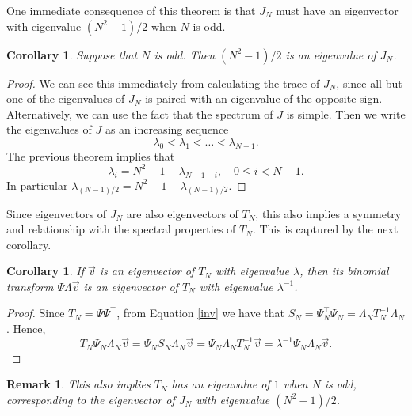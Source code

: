 \documentclass[11pt]{amsart}
\theoremstyle{plain}
\newtheorem{corollary}[theorem]{Corollary}
\newtheorem{remark}[theorem]{Remark}
\theoremstyle{named}
\begin{document}
One immediate consequence of this theorem is  that $J_N$ must have an eigenvector with eigenvalue $(N^2-1)/2$ when $N$ is odd.
\begin{corollary}
Suppose that $N$ is odd.
Then $(N^2-1)/2$ is an eigenvalue of $J_N$.
\end{corollary}
\begin{proof}
We can see this immediately from calculating the trace of $J_N$, since all but one of the eigenvalues of $J_N$ is paired with an eigenvalue of the opposite sign.
Alternatively, we can use the fact that the spectrum of $J$ is simple.
Then we write the eigenvalues of $J$ as an increasing sequence
$$\lambda_0 < \lambda_1 < \dots < \lambda_{N-1}.$$
The previous theorem implies that $$\lambda_i = N^2-1-\lambda_{N-1-i},\quad 0 \leq i < N-1.$$
In particular $\lambda_{(N-1)/2}=N^2-1-\lambda_{(N-1)/2}$.
\end{proof}

Since eigenvectors of $J_N$ are also eigenvectors of $T_N$, %
this also implies a symmetry and relationship with the spectral properties of $T_N$.
This is captured by the next corollary.
\begin{corollary}
If $\vec v$ is an eigenvector of $T_N$ with eigenvalue $\lambda$, then its  binomial transform $\Psi \Lambda \vec v$ is an eigenvector of $T_N$ with eigenvalue $\lambda^{-1}$.
\end{corollary}
\begin{proof}
Since $T_N=\Psi\Psi^\intercal$, from Equation \eqref{inv} we have that 
$S_N=\Psi_N^\intercal\Psi_N = \Lambda_NT_N^{-1}\Lambda_N$. Hence,
$$T_N\Psi_N\Lambda_N\vec v = \Psi_N S_N\Lambda_N\vec v = \Psi_N\Lambda_NT_N^{-1}\vec v = \lambda^{-1}\Psi_N\Lambda_N\vec v.$$
\end{proof}
\begin{remark}
This also implies $T_N$ has an eigenvalue of $1$ when $N$ is odd, corresponding to the eigenvector of $J_N$ with eigenvalue $(N^2-1)/2$.
\end{remark}
\end{document}
